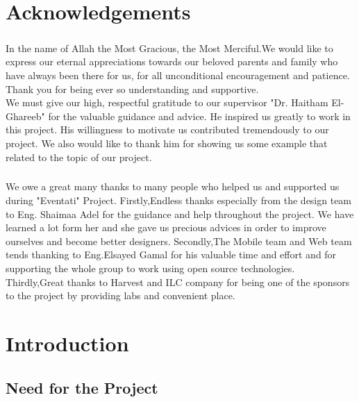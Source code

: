 \documentclass[12pt,a4paper,class,twoside,openany]{report}
\begin{document}
\chapter*{Acknowledgements}
\paragraph*{\hspace{.9 cm} }
In the name of Allah the Most Gracious, the Most Merciful.We would like to express our eternal appreciations towards our beloved parents and family who have always been there for us, for all unconditional encouragement and patience. Thank you for being ever so understanding and supportive.\\
We must give our high, respectful gratitude to our supervisor "Dr. Haitham El-Ghareeb" for the valuable guidance and advice. He inspired us greatly to work in this project. His willingness to motivate us contributed tremendously to our project. We also would like to thank him for showing us some example that related to the topic of our project.\\
\paragraph*{\hspace{.9 cm} }We owe a great many thanks to many people who helped us and supported us during "Eventati" Project.
Firstly,Endless thanks especially from the design team to Eng. Shaimaa Adel for the guidance and help throughout the project. We have learned a lot form her and she gave us precious advices in order to improve ourselves and become better designers.
Secondly,The Mobile team and Web team tends thanking to Eng.Elsayed Gamal for his valuable time and effort and for supporting the whole group to work using open source technologies.
Thirdly,Great thanks to Harvest and ILC company for being one of the sponsors to the project by providing labs and convenient place.
\tableofcontents
\cleardoublepage
\listoffigures
\cleardoublepage
\listoftables
\cleardoublepage
{}
\cleardoublepage
\chapter{Introduction}
\section{Need for the Project}
\end{document}
